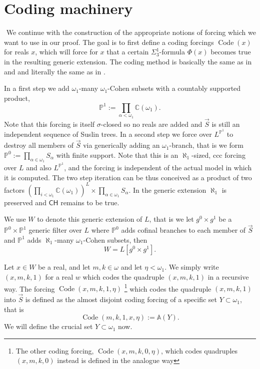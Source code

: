 \documentclass[a4paper,11pt]{article}
\newcommand{\forceP}{\mathbb{P}}
\newcommand{\CH}{\mathsf{CH}}
\begin{document}
    \section{Coding machinery}
    ﻿
    We continue with the construction of the appropriate notions of forcing which we want to use in our proof. The goal is to first define a coding forcings $\operatorname{Code} (x)$ for reals $x$, which will force for $x$ that a certain $\Sigma^1_3$-formula $\Phi(x)$ becomes true in the resulting generic extension. The coding method is basically the same as in \cite{Reduction} and \cite{Uniformization} and literally the same as in \cite{Separation without reduction}.
   
    In a first step we add $\omega_1$-many $\omega_1$-Cohen subsets with a countably supported product, $$\forceP^1:= \prod_{\alpha< \omega_1} \mathbb{C} (\omega_1).$$
    ﻿
    Note that this forcing is itself $\sigma$-closed so no reals are added and $\vec{S}$ is still an independent sequence of Suslin trees. In a second step we force over $L^{\forceP^1}$ to destroy all members of $\vec{S}$ via generically adding an $\omega_1$-branch, that is we  form $\forceP^0:=\prod_{\alpha \in \omega_1} S_{\alpha}$ with finite support. Note that this is an $\aleph_1$-sized, ccc forcing over $L$ and also $L^{\forceP^1}$, and the forcing is independent of the actual model in which it is computed. The two step iteration can be thus conceived as a product of two factors $(\prod_{i < \omega_1} \mathbb{C} (\omega_1))^L \times \prod_{\alpha \in \omega_1} S_{\alpha}$.  In the generic extension $\aleph_1$ is preserved and $\CH$ remains to be true.  
   
     We use $W$ to denote this generic extension of $L$, that is we let $g^0 \times g^1$ be a $\forceP^0 \times \forceP^1$ generic filter over $L$  where $\forceP^0$ adds cofinal branches to each member of $\vec{S}$ and $\forceP^1$ adds $\aleph_1$-many $\omega_1$-Cohen subsets, then \[W=L[g^0 \times g^1].\]

   
     Let $x \in W$ be a real,  and let $m,k \in \omega$ and let $\eta <\omega_1$. We simply write $(x,m,k,1)$ for a real $w$ which codes the quadruple $(x,m,k,1)$ in a recursive way. The forcing $\operatorname{Code}(x,m,k,1,\eta)$ \footnote{The other coding forcing,  $\operatorname{Code}(x,m,k,0,\eta)$, which codes quadruples $(x,m,k,0)$ instead is defined in the analogue way}  which codes the quadruple $(x,m,k,1)$ into $\vec{S}$ is defined as the almost disjoint coding forcing of a specific set $Y \subset \omega_1$, that is
    ﻿
     \[ \operatorname{Code}(m,k,1,x,\eta) := {\mathbb{A}}({Y}).\]  We will define the crucial set $Y \subset \omega_1$ now.
\end{document}
